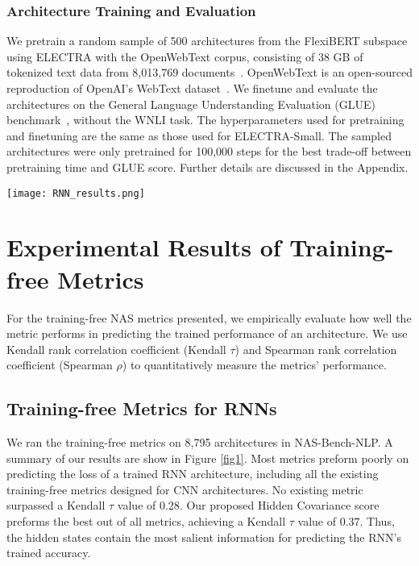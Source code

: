 \documentclass[11pt]{article}
\begin{document}
\subsubsection{Architecture Training and Evaluation}
    We pretrain a random sample of 500 architectures from the \mbox{FlexiBERT} subspace using ELECTRA with the OpenWebText corpus, consisting of 38 GB of tokenized text data from 8,013,769 documents~\cite{gokaslan_openwebtext_2019}. OpenWebText is an open-sourced reproduction of OpenAI's WebText dataset~\cite{radford_language_2019}. We finetune and evaluate the architectures on the General Language Understanding Evaluation (GLUE) benchmark~\cite{wang_glue_2019}, without the WNLI task. The hyperparameters used for pretraining and finetuning are the same as those used for ELECTRA-Small. The sampled architectures were only pretrained for 100,000 steps for the best trade-off between pretraining time and GLUE score. Further details are discussed in the Appendix.

    \begin{figure*}[h!]
        \centering
        \texttt{[image: RNN\_results.png]}
        \caption{Plots of training-free metrics evaluated on 8,795 RNN architectures in NAS-Bench-NLP, against test loss of the architectures assessed on the Penn Treebank dataset when trained. Loss values are from NAS-Bench-NLP, and Kendall $\tau$ and Spearman $\rho$ also shown. Only our Hidden Covariance metric performed on the first and second layer of the RNN showed a substantial correlation between the metric and trained test loss. Some other metrics do have some minor positive correlations.}
        \label{fig1}
    \end{figure*}

\section{Experimental Results of Training-free Metrics}
    For the training-free NAS metrics presented, we empirically evaluate how well the metric performs in predicting the trained performance of an architecture. We use Kendall rank correlation coefficient (Kendall $\tau$) and Spearman rank correlation coefficient (Spearman $\rho$) to quantitatively measure the metrics' performance.

\subsection{Training-free Metrics for RNNs}
    We ran the training-free metrics on 8,795 architectures in NAS-Bench-NLP. A summary of our results are show in Figure \ref{fig1}. Most metrics preform poorly on predicting the loss of a trained RNN architecture, including all the existing training-free metrics designed for CNN architectures. No existing metric surpassed a Kendall $\tau$ value of $0.28$. Our proposed Hidden Covariance score preforms the best out of all metrics, achieving a Kendall $\tau$ value of $0.37$. Thus, the hidden states contain the most salient information for predicting the RNN's trained accuracy.
\end{document}

